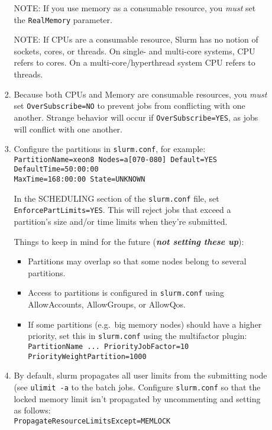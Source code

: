 \begin{enumerate}
\begin{enumerate}
\begin{enumerate}
            NOTE: If you use memory as a consumable resource, you \emph{must} set the \texttt{RealMemory} parameter.
	
            NOTE: If CPUs are a consumable resource, Slurm has no notion of sockets, cores, or threads. On single- and multi-core systems, CPU refers to cores. On a multi-core/hyperthread system CPU refers to threads.
	
          \item Because both CPUs and Memory are consumable resources, you \emph{must} set \texttt{OverSubscribe=NO} to prevent jobs from conflicting with one another. Strange behavior will occur if \texttt{OverSubscribe=YES}, as jobs will conflict with one another. %

          \item Configure the partitions in \texttt{slurm.conf}, for example: \\
            \texttt{PartitionName=xeon8 Nodes=a[070-080] Default=YES DefaultTime=50:00:00 \\ MaxTime=168:00:00 State=UNKNOWN}

            In the SCHEDULING section of the \texttt{slurm.conf} file, set \texttt{EnforcePartLimits=YES}. This will reject jobs that exceed a partition's size and/or time limits when they're submitted.

            Things to keep in mind for the future (\emph{\textbf{not setting these up}}):
            \begin{itemize}
              \item Partitions may overlap so that some nodes belong to several partitions. 
	
              \item Access to partitions is configured in \texttt{slurm.conf} using AllowAccounts, AllowGroups, or AllowQos.
	
              \item If some partitions (e.g.\ big memory nodes) should have a higher priority, set this in \texttt{slurm.conf} using the multifactor plugin:
                \texttt{PartitionName ... PriorityJobFactor=10} \\
                \texttt{PriorityWeightPartition=1000}
            \end{itemize}

          \item By default, slurm propagates all user limits from the submitting node (see \texttt{ulimit -a} to the batch jobs. Configure \texttt{slurm.conf} so that the locked memory limit isn't propagated by uncommenting and setting as follows: \\
            \texttt{PropagateResourceLimitsExcept=MEMLOCK}
	

\end{enumerate}
\end{enumerate}
\end{enumerate}
